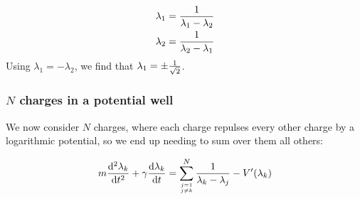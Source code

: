 \documentclass[12pt,a4paper]{article}
\def\D{ {\rm d} }
\def\dt{\D t}
\begin{document}
\begin{align*}
\lambda_1 = {1 \over \lambda_1 -\lambda_2}  \\
\lambda_2 = {1 \over \lambda_2 -\lambda_1} 
\end{align*}
Using $\lambda_1 = -\lambda_2$, we find that $\lambda_1 = \pm{1 \over \sqrt 2}$.

\subsubsection{$N$ charges in a potential well}
We now consider $N$ charges, where each charge repulses every other charge by a logarithmic potential,  so we end up needing to sum over them all others:


\begin{align*}
m {\D^2 \lambda_k \over \D t^2} + \gamma {\D \lambda_k \over \dt}  = 
    \sum_{j=1 \atop j \neq k}^N {1 \over \lambda_k -\lambda_j} - V'(\lambda_k) 
\end{align*}
\end{document}
